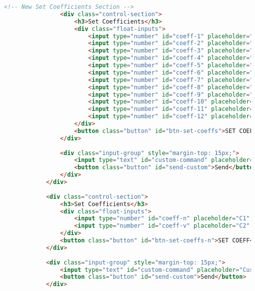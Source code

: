\begin{lstlisting}[language=html]
                <!-- New Set Coefficients Section -->
                <div class="control-section">
                    <h3>Set Coefficients</h3>
                    <div class="float-inputs">
                        <input type="number" id="coeff-1" placeholder="C1" step="0.1">
                        <input type="number" id="coeff-2" placeholder="C2" step="0.1">
                        <input type="number" id="coeff-3" placeholder="C3" step="0.1">
                        <input type="number" id="coeff-4" placeholder="C4" step="0.1">
                        <input type="number" id="coeff-5" placeholder="C5" step="0.1">
                        <input type="number" id="coeff-6" placeholder="C6" step="0.1">
                        <input type="number" id="coeff-7" placeholder="C7" step="0.1">
                        <input type="number" id="coeff-8" placeholder="C8" step="0.1">
                        <input type="number" id="coeff-9" placeholder="C9" step="0.1">
                        <input type="number" id="coeff-10" placeholder="C10" step="0.1">
                        <input type="number" id="coeff-11" placeholder="C11" step="0.1">
                        <input type="number" id="coeff-12" placeholder="C12" step="0.1">
                    </div>
                    <button class="button" id="btn-set-coeffs">SET COEFFS</button>
                </div>
                
                <div class="input-group" style="margin-top: 15px;">
                    <input type="text" id="custom-command" placeholder="Custom command">
                    <button class="button" id="send-custom">Send</button>
                </div>
            </div>
    
            <div class="control-section">
                <h3>Set Coefficients</h3>
                <div class="float-inputs">
                    <input type="number" id="coeff-n" placeholder="C1" step="1">
                    <input type="number" id="coeff-v" placeholder="C2" step="0.1">
                </div>
                <button class="button" id="btn-set-coeffs-n">SET COEFF</button>
            </div>
            
            <div class="input-group" style="margin-top: 15px;">
                <input type="text" id="custom-command" placeholder="Custom command">
                <button class="button" id="send-custom">Send</button>
            </div>
    

\end{lstlisting}

